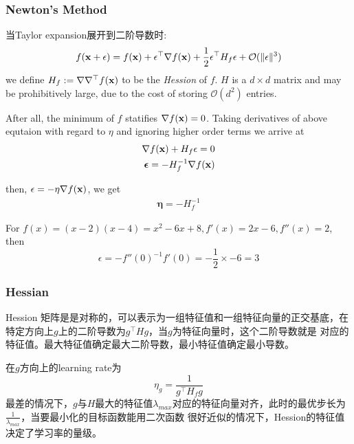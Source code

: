 \subsubsection{Newton's Method}
当Taylor expansion展开到二阶导数时:
\begin{equation}
    f(\mathbf{x} + \epsilon) = f(\mathbf{x}) + \epsilon^\top \nabla f(\mathbf{x}) + \frac{1}{2} \epsilon^\top H_f \epsilon
    + \mathcal{O}(\|\epsilon\|^3)
\end{equation}
we define $H_f := \nabla \nabla ^\top f(\mathbf{x})$ to be the \textit{Hession} of $f$. $H$ is a $d \times  d$ matrix and may be
prohibitively large, due to the cost of storing $\mathcal{O}(d^2)$ entries.

\par

After all, the minimum of $f$ statifies $\nabla f(\mathbf{x}) = 0$.  Taking derivatives of above equtaion with regard to $\eta$ and
ignoring higher order terms we arrive at
\begin{equation}
    \begin{split}
        \nabla f(\mathbf{x}) + H_f \epsilon = 0 \\
        \bm{\epsilon} = -H_f^{-1} \nabla f(\mathbf{x})
    \end{split}
\end{equation}

then, $\epsilon = -\eta \nabla f(\mathbf{x})$, we get
\begin{equation}
    \begin{split}
        \bm{\eta} = -H_f^{-1}
    \end{split}
\end{equation}

For $f(x) = (x-2)(x-4) = x^2 - 6x + 8, f'(x) = 2x - 6, f''(x) = 2$, then
\begin{equation}
    \epsilon = -f''(0)^{-1} f'(0) = -\frac{1}{2} \times -6 = 3
\end{equation}

\subsubsection{Hessian}
Hession 矩阵是是对称的，可以表示为一组特征值和一组特征向量的正交基底，在特定方向上$g$上的二阶导数为$g^\top H g$，当$g$为特征向量时，这个二阶导数就是
对应的特征值。最大特征值确定最大二阶导数，最小特征值确定最小导数。\par
在$g$方向上的learning rate为
\begin{equation}
    \eta_g = \frac{1}{g^\top H_f g}
\end{equation}
最差的情况下，$g$与$H$最大的特征值$\lambda_{max}$对应的特征向量对齐，此时的最优步长为$\frac{1}{\lambda_{max}}$，当要最小化的目标函数能用二次函数
很好近似的情况下，Hession的特征值决定了学习率的量级。

